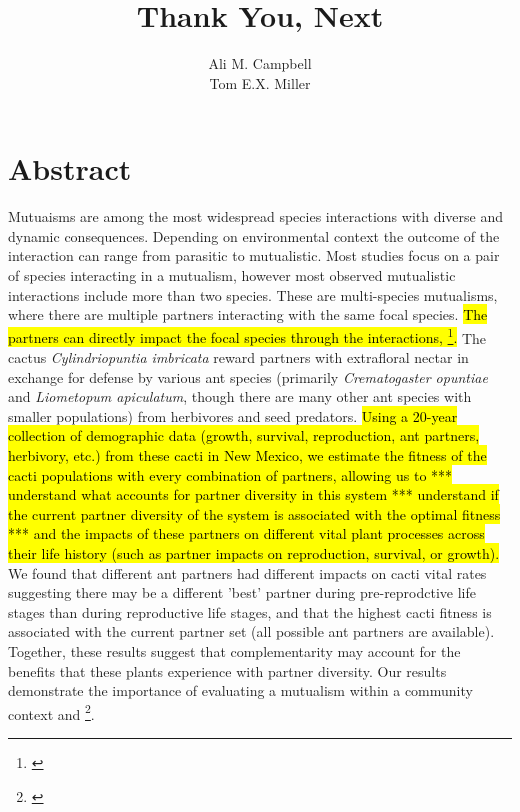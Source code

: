 \documentclass[12pt,a4paper]{article}
\title{Thank You, Next}
\author{Ali M. Campbell\\
	Tom E.X. Miller}
\newcommand{\tom}[2]{{\color{red}{#1}}\footnote{\textit{\color{red}{#2}}}}
\begin{document}
	\maketitle
	
	\section*{Abstract}

Mutuaisms are among the most widespread species interactions with diverse and dynamic consequences.
Depending on environmental context the outcome of the interaction can range from parasitic to mutualistic. 
Most studies focus on a pair of species interacting in a mutualism, however most observed mutualistic interactions include more than two species. 
These are multi-species mutualisms, where there are multiple partners interacting with the same focal species. 
\hl{The partners can directly impact the focal species through the interactions, \tom{and indirectly impact them through interactions with each other}{***This is true but not something we are well poised to address with our data so might be risky to bring it up.***}. }
The cactus \textit{Cylindriopuntia imbricata} reward partners with extrafloral nectar in exchange for defense by various ant species (primarily \textit{Crematogaster opuntiae} and \textit{Liometopum apiculatum}, though there are many other ant species with smaller populations) from herbivores and seed predators. 
\hl{Using a 20-year collection of demographic data (growth, survival, reproduction, ant partners, herbivory, etc.) from these cacti in New Mexico, we estimate the fitness of the cacti populations with every combination of partners, allowing us to *** understand what accounts for partner diversity in this system *** understand if the current partner diversity of the system is associated with the optimal fitness *** and the impacts of these partners on different vital plant processes across their life history (such as partner impacts on reproduction, survival, or growth). }
We found that different ant partners had different impacts on cacti vital rates suggesting there may be a different 'best' partner during pre-reprodctive life stages than during reproductive life stages, and that the highest cacti fitness is associated with the current partner set (all possible ant partners are available).
Together, these results suggest that complementarity may account for the benefits that these plants experience with partner diversity. 
Our results demonstrate the importance of evaluating a mutualism within a community context and \tom{suggest that even slight differences of rewards between mutualist partners can help promote fitness of the cacti}{Nothing you have reported in the abstract so far really supports this statement.}. 
\end{document}
